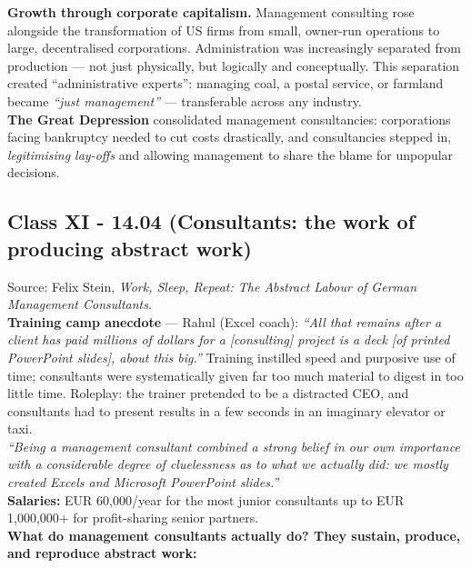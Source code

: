 \documentclass[a4paper,12pt]{article}
\begin{document}
\noindent \textbf{Growth through corporate capitalism.} Management consulting rose alongside the transformation of US firms from small, owner-run operations to large, decentralised corporations. Administration was increasingly separated from production --- not just physically, but logically and conceptually. This separation created ``administrative experts'': managing coal, a postal service, or farmland became \emph{``just management''} --- transferable across any industry. \\

\noindent \textbf{The Great Depression} consolidated management consultancies: corporations facing bankruptcy needed to cut costs drastically, and consultancies stepped in, \emph{legitimising lay-offs} and allowing management to share the blame for unpopular decisions.

\subsection*{Class XI - 14.04 (Consultants: the work of producing abstract work)}
\noindent Source: Felix Stein, \emph{Work, Sleep, Repeat: The Abstract Labour of German Management Consultants}. \\

\noindent \textbf{Training camp anecdote} — Rahul (Excel coach): \emph{``All that remains after a client has paid millions of dollars for a [consulting] project is a deck [of printed PowerPoint slides], about this big.''} Training instilled speed and purposive use of time; consultants were systematically given far too much material to digest in too little time. Roleplay: the trainer pretended to be a distracted CEO, and consultants had to present results in a few seconds in an imaginary elevator or taxi. \\

\noindent \emph{``Being a management consultant combined a strong belief in our own importance with a considerable degree of cluelessness as to what we actually did: we mostly created Excels and Microsoft PowerPoint slides.''} \\

\noindent \textbf{Salaries:} EUR 60,000/year for the most junior consultants up to EUR 1,000,000+ for profit-sharing senior partners. \\

\noindent \textbf{What do management consultants actually do? They sustain, produce, and reproduce abstract work:}
\end{document}
